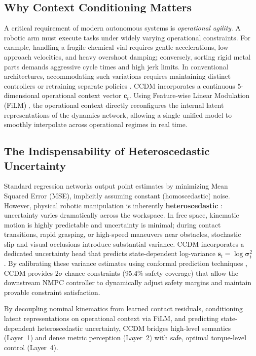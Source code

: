 \documentclass[10pt,a4paper]{article}
\begin{document}
\subsection{Why Context Conditioning Matters}
A critical requirement of modern autonomous systems is \emph{operational agility}. A robotic arm must execute tasks under widely varying operational constraints. For example, handling a fragile chemical vial requires gentle accelerations, low approach velocities, and heavy overshoot damping; conversely, sorting rigid metal parts demands aggressive cycle times and high jerk limits. In conventional architectures, accommodating such variations requires maintaining distinct controllers or retraining separate policies \cite{kumar2021rma}. CCDM incorporates a continuous 5-dimensional operational context vector $\mathbf{c}_t$. Using Feature-wise Linear Modulation (FiLM) \cite{perez2018film}, the operational context directly reconfigures the internal latent representations of the dynamics network, allowing a single unified model to smoothly interpolate across operational regimes in real time.

\subsection{The Indispensability of Heteroscedastic Uncertainty}
Standard regression networks output point estimates by minimizing Mean Squared Error (MSE), implicitly assuming constant (homoscedastic) noise. However, physical robotic manipulation is inherently \textbf{heteroscedastic} \cite{kendall2017what, lakshminarayanan2017simple}: uncertainty varies dramatically across the workspace. In free space, kinematic motion is highly predictable and uncertainty is minimal; during contact transitions, rapid grasping, or high-speed maneuvers near obstacles, stochastic slip and visual occlusions introduce substantial variance. CCDM incorporates a dedicated uncertainty head that predicts state-dependent log-variance $\mathbf{s}_t = \log \bm{\sigma}_t^2$. By calibrating these variance estimates using conformal prediction techniques \cite{angelopoulos2021gentle}, CCDM provides $2\sigma$ chance constraints (95.4\% safety coverage) that allow the downstream NMPC controller to dynamically adjust safety margins and maintain provable constraint satisfaction.

\begin{takeawaybox}
By decoupling nominal kinematics from learned contact residuals, conditioning latent representations on operational context via FiLM, and predicting state-dependent heteroscedastic uncertainty, CCDM bridges high-level semantics (Layer~1) and dense metric perception (Layer~2) with safe, optimal torque-level control (Layer~4).
\end{takeawaybox}
\end{document}
